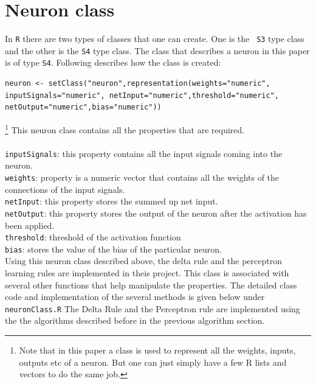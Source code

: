 \documentclass[a4paper,12pt]{report}
\begin{document}
\section*{Neuron class}
In \verb+R+ there are two types of classes that one can create. One is the \verb+ S3+ type class and the other is the \verb+S4+ type class.
The class that describes a neuron in this paper is of type \verb+S4+. Following describes how the class is created:
\begin{lstlisting}[breaklines]
 neuron <- setClass("neuron",representation(weights="numeric", inputSignals="numeric", netInput="numeric",threshold="numeric", netOutput="numeric",bias="numeric"))
\end{lstlisting}

\footnote{Note that in this paper a class is used to represent all the weights, inputs, outputs etc of a neuron. But one can just simply have a few R lists and vectors to do the same job.}
This neuron class contains all the properties that are required. \\ \\
\verb+inputSignals+: this property contains all the input signals coming into the neuron.\\
\verb+weights+: property is a numeric vector that contains all the weights of the connections of the input signals.\\
\verb+netInput+: this property stores the summed up net input.\\
\verb+netOutput+: this property stores the output of the neuron after the activation has been applied.\\
\verb+threshold+: threshold of the activation function\\
\verb+bias+: stores the value of the bias of the particular neuron.\\

Using this neuron class described above, the delta rule and the perceptron learning rules are implemented in theis project.
This class is associated with several other functions that help manipulate the properties. The detailed class code and implementation of the several methods is given below under \verb+neuronClass.R+ The Delta Rule and the Perceptron rule 
are implemented using the the algorithms described before in the previous algorithm section. 
\end{document}
